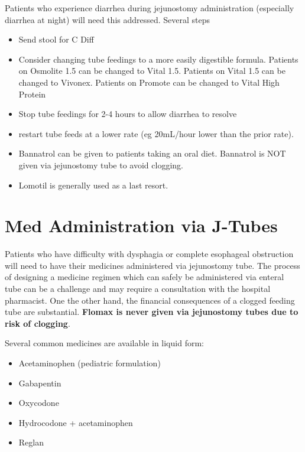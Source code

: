 \documentclass[
]{book}
\providecommand{\tightlist}{%
  \setlength{\itemsep}{0pt}\setlength{\parskip}{0pt}}
\begin{document}
Patients who experience diarrhea during jejunostomy administration (especially diarrhea at night) will need this addressed. Several steps

\begin{itemize}
\tightlist
\item
  Send stool for C Diff
\item
  Consider changing tube feedings to a more easily digestible formula. Patients on Osmolite 1.5 can be changed to Vital 1.5. Patients on Vital 1.5 can be changed to Vivonex. Patients on Promote can be changed to Vital High Protein
\item
  Stop tube feedings for 2-4 hours to allow diarrhea to resolve
\item
  restart tube feeds at a lower rate (eg 20mL/hour lower than the prior rate).
\item
  Bannatrol can be given to patients taking an oral diet. Bannatrol is NOT given via jejunostomy tube to avoid clogging.
\item
  Lomotil is generally used as a last resort.
\end{itemize}

\hypertarget{med-administration-via-j-tubes}{%
\section{Med Administration via J-Tubes}\label{med-administration-via-j-tubes}}

Patients who have difficulty with dysphagia or complete esophageal obstruction will need to have their medicines administered via jejunostomy tube. The process of designing a medicine regimen which can safely be administered via enteral tube can be a challenge and may require a consultation with the hospital pharmacist. One the other hand, the financial consequences of a clogged feeding tube are substantial. \textbf{Flomax is never given via jejunostomy tubes due to risk of clogging}.

Several common medicines are available in liquid form:

\begin{itemize}
\tightlist
\item
  Acetaminophen (pediatric formulation)
\item
  Gabapentin
\item
  Oxycodone
\item
  Hydrocodone + acetaminophen
\item
  Reglan
\end{itemize}
\end{document}
